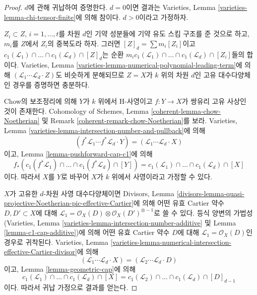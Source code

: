 \begin{proof}
$d$에 관해 귀납하여 증명한다. $d = 0$이면 결과는 Varieties, Lemma
\ref{varieties-lemma-chi-tensor-finite}에 의해 참이다.
$d > 0$이라고 가정하자.

\medskip\noindent
$Z_i \subset Z$, $i = 1, \ldots, t$를 차원 $d$인 기약 성분들에
기약 유도 스킴 구조를 준 것으로 하고, $m_i$를 $Z$에서 $Z_i$의
중복도라 하자. 그러면 $[Z]_d = \sum m_i[Z_i]$이고
$c_1(\mathcal{L}_1) \cap \ldots \cap c_1(\mathcal{L}_d) \cap [Z]_d$는
순환
$m_i c_1(\mathcal{L}_1) \cap \ldots \cap c_1(\mathcal{L}_d) \cap [Z_i]$들의
합이다. Varieties, Lemma
\ref{varieties-lemma-numerical-polynomial-leading-term}에 의해
$(\mathcal{L}_1 \cdots \mathcal{L}_d \cdot Z)$도 비슷하게 분해되므로
$Z = X$가 $k$ 위의 차원 $d$인 고유 대수다양체인 경우를 증명하면
충분하다.

\medskip\noindent
Chow의 보조정리에 의해 $Y$가 $k$ 위에서 H-사영이고
$f : Y \to X$가 쌍유리 고유 사상인 것이 존재한다. Cohomology of
Schemes, Lemma \ref{coherent-lemma-chow-Noetherian} 및 Remark
\ref{coherent-remark-chow-Noetherian}를 보라. Varieties, Lemma
\ref{varieties-lemma-intersection-number-and-pullback}에 의해
$$
(f^*\mathcal{L}_1 \cdots f^*\mathcal{L}_d \cdot Y) =
(\mathcal{L}_1 \cdots \mathcal{L}_d \cdot X)
$$
이고, Lemma \ref{lemma-pushforward-cap-c1}에 의해
$$
f_*(c_1(f^*\mathcal{L}_1) \cap \ldots \cap c_1(f^*\mathcal{L}_d) \cap [Y]) =
c_1(\mathcal{L}_1) \cap \ldots \cap c_1(\mathcal{L}_d) \cap [X]
$$
이다. 따라서 $X$를 $Y$로 바꾸어 $X$가 $k$ 위에서 사영이라고 가정할
수 있다.

\medskip\noindent
$X$가 고유한 $d$-차원 사영 대수다양체이면 Divisors, Lemma
\ref{divisors-lemma-quasi-projective-Noetherian-pic-effective-Cartier}에
의해 어떤 유효 Cartier 약수 $D, D' \subset X$에 대해
$\mathcal{L}_1 = \mathcal{O}_X(D) \otimes \mathcal{O}_X(D')^{\otimes -1}$로
쓸 수 있다. 등식 양변의 가법성(Varieties, Lemma
\ref{varieties-lemma-intersection-number-additive} 및 Lemma
\ref{lemma-c1-cap-additive})에 의해 어떤 유효 Cartier 약수 $D$에 대해
$\mathcal{L}_1 = \mathcal{O}_X(D)$인 경우로 귀착된다. Varieties,
Lemma \ref{varieties-lemma-numerical-intersection-effective-Cartier-divisor}에
의해
$$
(\mathcal{L}_1 \cdots \mathcal{L}_d \cdot X) =
(\mathcal{L}_2 \cdots \mathcal{L}_d \cdot D)
$$
이고, Lemma \ref{lemma-geometric-cap}에 의해
$$
c_1(\mathcal{L}_1) \cap \ldots \cap c_1(\mathcal{L}_d) \cap [X] =
c_1(\mathcal{L}_2) \cap \ldots \cap c_1(\mathcal{L}_d) \cap [D]_{d - 1}
$$
이다. 따라서 귀납 가정으로 결과를 얻는다.
\end{proof}








